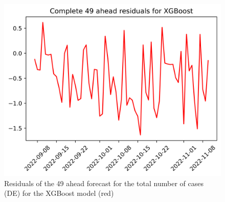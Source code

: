 \begin{figure}
\begin{minipage}{.32\textwidth}
  \label{fig:tot_cases_error_49_xgb}
\end{minipage}
\begin{minipage}{.32\textwidth}
  \centering
  \includegraphics[width=\linewidth]{pics/49_ah/DE_49_ahead_errors_XGBoost.png}
  \caption{Residuals of the 49 ahead forecast for the total number of cases (DE) for the XGBoost model (red)}
  \label{fig:tot_cases_error_49_xgb_DE}
\end{minipage}

\end{figure}
